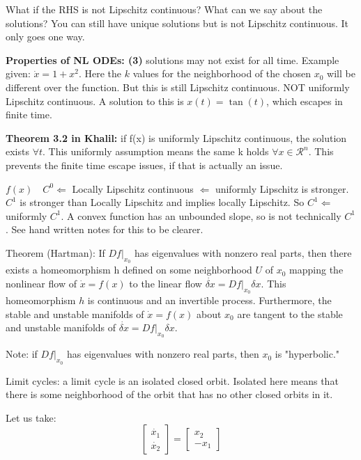 \documentclass[11pt]{article}
\begin{document}
What if the RHS is not Lipschitz continuous? What can we say about the solutions? You can still have unique solutions but is not Lipschitz continuous. It only goes  one way.

\textbf{Properties of NL ODEs: (3)} solutions may not exist for all time. Example given: $\dot{x} = 1+x^2$. Here the $k$ values for the neighborhood of the chosen $x_0$ will be different over the function. But this is still Lipschitz continuous. NOT uniformly Lipschitz continuous. A solution to this is $x(t)=\tan(t)$, which escapes in finite time. 

\textbf{Theorem 3.2 in Khalil:} if f(x) is uniformly Lipschitz continuous, the solution exists $\forall t$. This uniformly assumption means the same k holds $\forall x \in \mathcal{R}^n$. This prevents the finite time escape issues, if that is actually an issue.

$f(x) \quad C^0 \Leftarrow$ Locally Lipschitz continuous $\Leftarrow$ uniformly Lipschitz is stronger. $C^1$ is stronger than Locally Lipschitz and implies locally Lipschitz. So $C^1 \Leftarrow$ uniformly $C^1$. A convex function has an unbounded slope, so is not technically $C^1$. See hand written notes for this to be clearer.

Theorem (Hartman): If $Df\rvert_{x_0}$ has eigenvalues with nonzero real parts, then there exists a homeomorphism h defined on some neighborhood $U$ of $x_0$ mapping the nonlinear flow of $\dot{x} = f(x)$ to the linear flow $ \dot{\delta x} = Df\rvert_{x_0}\delta x$. This homeomorphism $h$ is continuous and an invertible process. Furthermore, the stable and unstable manifolds of $\dot{x} = f(x)$ about $x_0$ are tangent to the stable and unstable manifolds of $ \dot{\delta x} = Df\rvert_{x_0}\delta x$.

Note: if $Df\rvert_{x_0}$ has eigenvalues with nonzero real parts, then $x_0$ is "hyperbolic."


Limit cycles: a limit cycle is an isolated closed orbit. Isolated here means that there is some neighborhood of the orbit that has no other closed orbits in it. 

Let us take:
\begin{equation}
\begin{bmatrix}
\dot{x_1} \\
\dot{x_2}
\end{bmatrix}
=
\begin{bmatrix}
x_2 \\
-x_1
\end{bmatrix}
\end{equation}
\end{document}

